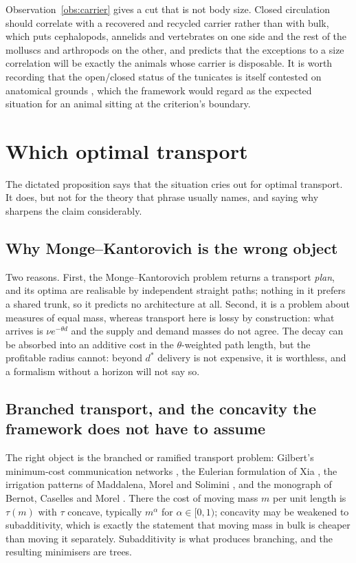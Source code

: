 \documentclass[11pt]{article}
\theoremstyle{plain}
\theoremstyle{definition}
\begin{document}
Observation~\ref{obs:carrier} gives a cut that is not body size. Closed circulation should correlate
with a recovered and recycled carrier rather than with bulk, which puts cephalopods, annelids and
vertebrates on one side and the rest of the molluscs and arthropods on the other, and predicts that
the exceptions to a size correlation will be exactly the animals whose carrier is disposable. It is
worth recording that the open/closed status of the tunicates is itself contested on anatomical
grounds \cite{konrad2016}, which the framework would regard as the expected situation for an animal
sitting at the criterion's boundary.

\section{Which optimal transport}
\label{sec:ot}

The dictated proposition says that the situation cries out for optimal transport. It does, but not
for the theory that phrase usually names, and saying why sharpens the claim considerably.

\subsection{Why Monge--Kantorovich is the wrong object}

Two reasons. First, the Monge--Kantorovich problem returns a transport \emph{plan}, and its optima are
realisable by independent straight paths; nothing in it prefers a shared trunk, so it predicts no
architecture at all. Second, it is a problem about measures of equal mass, whereas transport here is
lossy by construction: what arrives is $\nu e^{-\theta d}$ and the supply and demand masses do not
agree. The decay can be absorbed into an additive cost in the $\theta$-weighted path length, but the
profitable radius cannot: beyond $d^{*}$ delivery is not expensive, it is worthless, and a formalism
without a horizon will not say so.

\subsection{Branched transport, and the concavity the framework does not have to assume}

The right object is the branched or ramified transport problem: Gilbert's minimum-cost communication
networks \cite{gilbert1967}, the Eulerian formulation of Xia \cite{xia2003}, the irrigation patterns
of Maddalena, Morel and Solimini \cite{mms2003}, and the monograph of Bernot, Caselles and Morel
\cite{bcm2009}. There the cost of moving mass $m$ per unit length is $\tau(m)$ with $\tau$ concave,
typically $m^{\alpha}$ for $\alpha \in [0,1)$; concavity may be weakened to subadditivity, which is
exactly the statement that moving mass in bulk is cheaper than moving it separately. Subadditivity is
what produces branching, and the resulting minimisers are trees.
\end{document}

